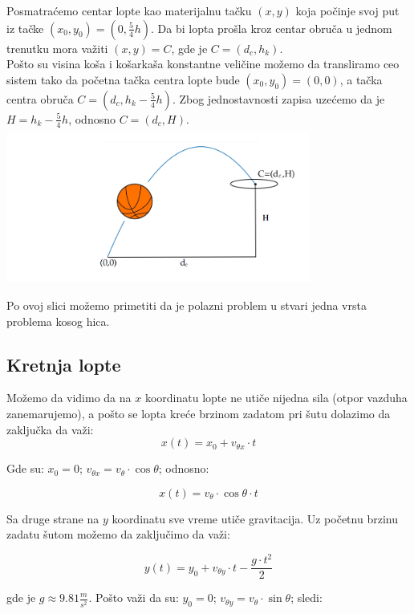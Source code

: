\documentclass[a4paper, 12pt]{article}
\begin{document}
Posmatraćemo centar lopte kao materijalnu tačku $(x,y)$ koja počinje svoj put iz tačke $(x_0,y_0) = (0,\dfrac{_5}{^4}h)$. Da bi lopta prošla kroz centar obruča u jednom trenutku mora važiti $(x,y) = C$, gde je $C = (d_c,h_k)$.\\

Pošto su visina koša i košarkaša konstantne veličine možemo da transliramo ceo sistem tako da početna tačka centra lopte bude $(x_0,y_0) = (0,0)$, a tačka centra obruča $C = (d_c,h_k-\dfrac{_5}{^4}h)$.
Zbog jednostavnosti zapisa uzećemo da je $H = h_k-\dfrac{_5}{^4}h$, odnosno $C = (d_c,H)$.\\


\includegraphics[width=10cm, height=5cm]{pic2} %

Po ovoj slici možemo primetiti da je polazni problem u stvari jedna vrsta problema kosog hica.

\pagebreak

\subsection{Kretnja lopte}

Možemo da vidimo da na $x$ koordinatu lopte ne utiče nijedna sila (otpor vazduha zanemarujemo), a pošto se lopta kreće brzinom zadatom pri šutu dolazimo da zaključka da važi:\\

\[x(t) = x_0 + v_{\theta x}\cdot t\]

Gde su: $x_0 = 0$; $v_{\theta x} = v_\theta \cdot \cos \theta$; odnosno:

\[x(t) = v_\theta \cdot \cos \theta \cdot t\]

Sa druge strane na $y$ koordinatu sve vreme utiče gravitacija. Uz početnu brzinu zadatu šutom možemo da zaključimo da važi:

\[y(t) = y_0 + v_{\theta y} \cdot t - \dfrac{g \cdot t^2}{2}\]

gde je $g \approx 9.81\dfrac{_m}{^{s^2}}$. Pošto važi da su: $y_0 = 0$; $v_{\theta y} = v_\theta \cdot \sin \theta$; sledi:
\end{document}
